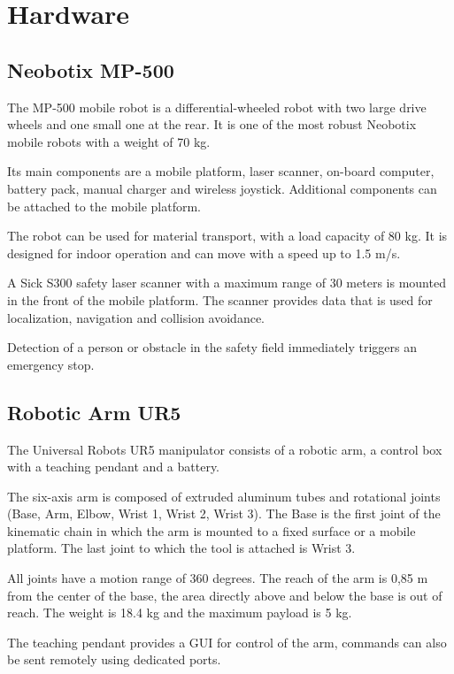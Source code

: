 \section{Hardware}

\subsection{Neobotix MP-500}
The MP-500 mobile robot is a differential-wheeled robot with two large drive wheels and one small one at the rear. It is one of the most robust Neobotix mobile robots with a weight of 70 kg.\par
Its main components are a mobile platform, laser scanner, on-board computer, battery pack, manual charger and wireless joystick. Additional components can be attached to the mobile platform.\par
The robot can be used for material transport, with a load capacity of 80 kg. It is designed for indoor operation and can move with a speed up to 1.5 m/s.\par
A Sick S300 safety laser scanner with a maximum range of 30 meters is mounted in the front of the mobile platform. The scanner provides data that is used for localization, navigation and collision avoidance.\par
Detection of a person or obstacle in the safety field immediately triggers an emergency stop.\par


\subsection{Robotic Arm UR5}
The Universal Robots UR5 manipulator consists of a robotic arm, a control box with a teaching pendant and a battery.\par
The six-axis arm is composed of extruded aluminum tubes and rotational joints (Base, Arm, Elbow, Wrist 1, Wrist 2, Wrist 3). The Base is the first joint of the kinematic chain in which the arm is mounted to a fixed surface or a mobile platform. The last joint to which the tool is attached is Wrist 3.\par
All joints have a motion range of 360 degrees. The reach of the arm is 0,85 m from the center of the base, the area directly above and below the base is out of reach. The weight is 18.4 kg and the maximum payload is 5 kg.\par
The teaching pendant provides a GUI for control of the arm, commands can also be sent remotely using dedicated ports.\par

